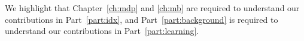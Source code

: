 We highlight that Chapter~\ref{ch:mdp} and \ref{ch:mb} are required to understand our contributions in Part~\ref{part:idx}, and
Part~\ref{part:background} is required to understand our contributions in Part~\ref{part:learning}.

%

\endgroup
